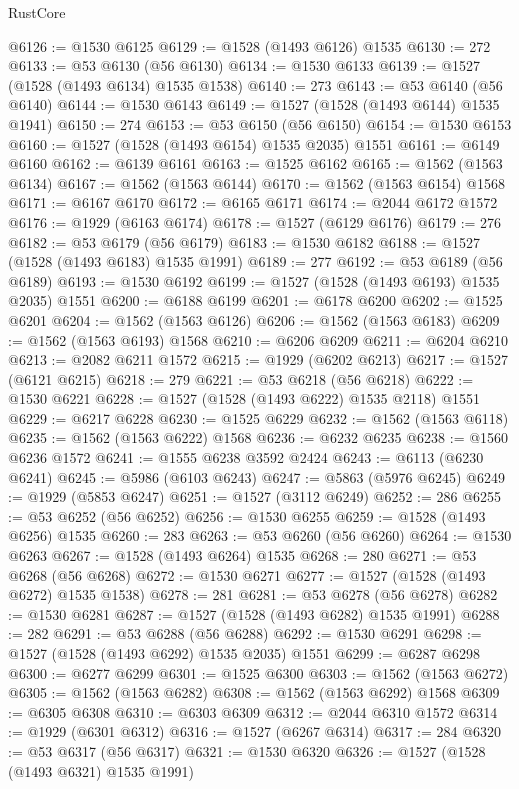 \begin{lexlean}{RustCore}
\begin{coremodule}
@6126 := @1530 @6125
@6129 := @1528 (@1493 @6126) @1535
@6130 := 272
@6133 := @53 @6130 (@56 @6130)
@6134 := @1530 @6133
@6139 := @1527 (@1528 (@1493 @6134) @1535 @1538)
@6140 := 273
@6143 := @53 @6140 (@56 @6140)
@6144 := @1530 @6143
@6149 := @1527 (@1528 (@1493 @6144) @1535 @1941)
@6150 := 274
@6153 := @53 @6150 (@56 @6150)
@6154 := @1530 @6153
@6160 := @1527 (@1528 (@1493 @6154) @1535 @2035) @1551
@6161 := @6149 @6160
@6162 := @6139 @6161
@6163 := @1525 @6162
@6165 := @1562 (@1563 @6134)
@6167 := @1562 (@1563 @6144)
@6170 := @1562 (@1563 @6154) @1568
@6171 := @6167 @6170
@6172 := @6165 @6171
@6174 := @2044 @6172 @1572
@6176 := @1929 (@6163 @6174)
@6178 := @1527 (@6129 @6176)
@6179 := 276
@6182 := @53 @6179 (@56 @6179)
@6183 := @1530 @6182
@6188 := @1527 (@1528 (@1493 @6183) @1535 @1991)
@6189 := 277
@6192 := @53 @6189 (@56 @6189)
@6193 := @1530 @6192
@6199 := @1527 (@1528 (@1493 @6193) @1535 @2035) @1551
@6200 := @6188 @6199
@6201 := @6178 @6200
@6202 := @1525 @6201
@6204 := @1562 (@1563 @6126)
@6206 := @1562 (@1563 @6183)
@6209 := @1562 (@1563 @6193) @1568
@6210 := @6206 @6209
@6211 := @6204 @6210
@6213 := @2082 @6211 @1572
@6215 := @1929 (@6202 @6213)
@6217 := @1527 (@6121 @6215)
@6218 := 279
@6221 := @53 @6218 (@56 @6218)
@6222 := @1530 @6221
@6228 := @1527 (@1528 (@1493 @6222) @1535 @2118) @1551
@6229 := @6217 @6228
@6230 := @1525 @6229
@6232 := @1562 (@1563 @6118)
@6235 := @1562 (@1563 @6222) @1568
@6236 := @6232 @6235
@6238 := @1560 @6236 @1572
@6241 := @1555 @6238 @3592 @2424
@6243 := @6113 (@6230 @6241)
@6245 := @5986 (@6103 @6243)
@6247 := @5863 (@5976 @6245)
@6249 := @1929 (@5853 @6247)
@6251 := @1527 (@3112 @6249)
@6252 := 286
@6255 := @53 @6252 (@56 @6252)
@6256 := @1530 @6255
@6259 := @1528 (@1493 @6256) @1535
@6260 := 283
@6263 := @53 @6260 (@56 @6260)
@6264 := @1530 @6263
@6267 := @1528 (@1493 @6264) @1535
@6268 := 280
@6271 := @53 @6268 (@56 @6268)
@6272 := @1530 @6271
@6277 := @1527 (@1528 (@1493 @6272) @1535 @1538)
@6278 := 281
@6281 := @53 @6278 (@56 @6278)
@6282 := @1530 @6281
@6287 := @1527 (@1528 (@1493 @6282) @1535 @1991)
@6288 := 282
@6291 := @53 @6288 (@56 @6288)
@6292 := @1530 @6291
@6298 := @1527 (@1528 (@1493 @6292) @1535 @2035) @1551
@6299 := @6287 @6298
@6300 := @6277 @6299
@6301 := @1525 @6300
@6303 := @1562 (@1563 @6272)
@6305 := @1562 (@1563 @6282)
@6308 := @1562 (@1563 @6292) @1568
@6309 := @6305 @6308
@6310 := @6303 @6309
@6312 := @2044 @6310 @1572
@6314 := @1929 (@6301 @6312)
@6316 := @1527 (@6267 @6314)
@6317 := 284
@6320 := @53 @6317 (@56 @6317)
@6321 := @1530 @6320
@6326 := @1527 (@1528 (@1493 @6321) @1535 @1991)

\end{coremodule}
\end{lexlean}
